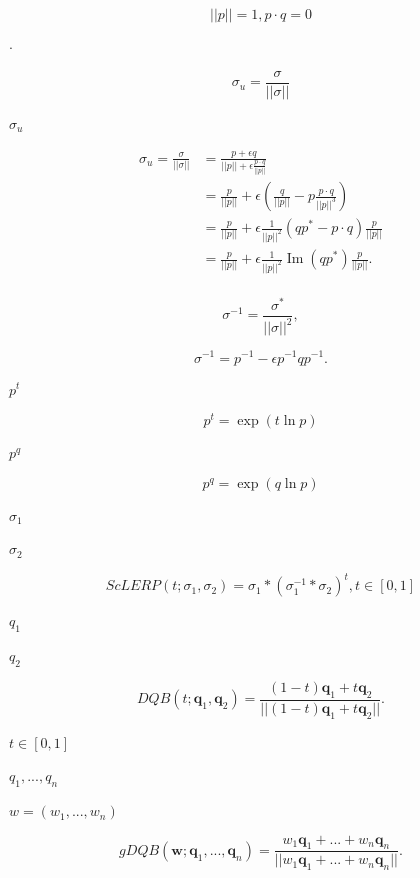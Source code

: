 \documentclass{article}
\begin{document}
\[||p||=1, p \cdot q=0
\]
\pagebreak

$\cdot$
\pagebreak

\[\sigma_{u}=\frac{\sigma}{||\sigma||}
\]
\pagebreak

$\sigma_u$
\pagebreak

\[\renewcommand{\Im}{\operatorname{Im}}
\begin{equation}
\begin{split}
\sigma_{u}=\frac{\sigma}{||\sigma||}&=\frac{p + \epsilon q}{||p||+\epsilon\frac{p\cdot q}{||p||}}\\
&=\frac{p}{||p||}+\epsilon\left(\frac{q}{||p||}-p\frac{p\cdot q}{||p||^3}\right)\\
&=\frac{p}{||p||}+\epsilon\frac{1}{||p||^2}\left(qp^{*}-p\cdot q\right)\frac{p}{||p||}\\
&=\frac{p}{||p||}+\epsilon\frac{1}{||p||^2}\Im(qp^*)\frac{p}{||p||}.\\
\end{split}
\end{equation}
\]
\pagebreak

\[\sigma^{-1} = \frac{\sigma^*}{||\sigma||^2}, \]
\pagebreak

\[\sigma^{-1} = p^{-1} - \epsilon p^{-1}qp^{-1}.\]
\pagebreak

$p^t$
\pagebreak

\[p^t = \exp(t\ln p)
\]
\pagebreak

$p^q$
\pagebreak

\[p^q = \exp(q\ln p)
\]
\pagebreak

$\sigma_1$
\pagebreak

$\sigma_2$
\pagebreak

\[       ScLERP(t;\sigma_1,\sigma_2) = \sigma_1 * (\sigma_1^{-1} * \sigma_2)^t, t\in[0,1]
\]
\pagebreak

$q_1$
\pagebreak

$q_2$
\pagebreak

\[DQB(t;{\boldsymbol{q}}_1,{\boldsymbol{q}}_2)=
\frac{(1-t){\boldsymbol{q}}_1+t{\boldsymbol{q}}_2}{||(1-t){\boldsymbol{q}}_1+t{\boldsymbol{q}}_2||}.
\]
\pagebreak

$t\in[0,1]$
\pagebreak

$q_1,...,q_n$
\pagebreak

$w = (w_1,...,w_n)$
\pagebreak

\[gDQB(\boldsymbol{w};{\boldsymbol{q}}_1,...,{\boldsymbol{q}}_n)=\frac{w_1{\boldsymbol{q}}_1+...+w_n{\boldsymbol{q}}_n}
{||w_1{\boldsymbol{q}}_1+...+w_n{\boldsymbol{q}}_n||}.
\]
\pagebreak
\end{document}
